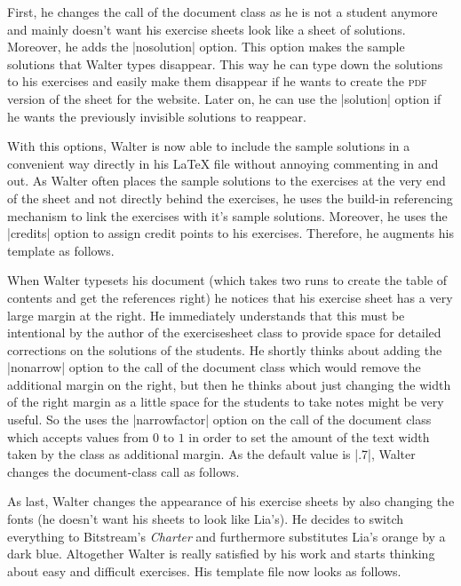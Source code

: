 \documentclass[a4paper,fleqn,9pt]{report}
\def\exercisesheet{{exercisesheet}}
\begin{document}
First, he changes the call of the document class as he is not a
student anymore and mainly doesn't want his exercise sheets look like
a sheet of solutions. Moreover, he adds the |nosolution|
option. This option makes the sample solutions that Walter types
disappear. This way he can type down the solutions to his exercises
and easily make them disappear if he wants to create the \textsc{pdf}
version of the sheet for the website. Later on, he can use the
|solution| option if he wants the previously invisible
solutions to reappear.



With this options, Walter is now able to include the sample solutions in
a convenient way directly in his \LaTeX{} file without annoying
commenting in and out. As Walter often places the sample solutions to the
exercises at the very end of the sheet and not directly behind the
exercises, he uses the build-in referencing mechanism to link the
exercises with it's sample solutions. Moreover, he uses the
|credits| option to assign credit points to his exercises.
Therefore, he augments his template as follows.



When Walter typesets his document (which takes two runs to create the
table of contents and get the references right) he notices that his
exercise sheet has a very large margin at the right. He immediately
understands that this must be intentional by the author of the
\exercisesheet{} class to provide space for detailed corrections on
the solutions of the students. He shortly thinks about adding the
|nonarrow| option to the call of the document class which
would remove the additional margin on the right, but then he thinks
about just changing the width of the right margin as a little space
for the students to take notes might be very useful. So the uses the
|narrowfactor| option on the call of the document class
which accepts values from $0$ to $1$ in order to set the amount of the
text width taken by the class as additional margin. As the default
value is |.7|, Walter changes the document-class call as
follows.



As last, Walter changes the appearance of his exercise sheets by also
changing the fonts (he doesn't want his sheets to look like Lia's). He
decides to switch everything to Bitstream's \emph{Charter} and
furthermore substitutes Lia's orange by a dark blue. Altogether Walter is
really satisfied by his work and starts thinking about easy and
difficult exercises. His template file now looks as follows.
\end{document}
